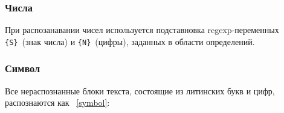 \subsubsection{Числа}\label{lexnumbers}


При распозанавании чисел используется подставновка regexp-переменных
\verb|{S}|\ (знак числа) и \verb|{N}|\ (цифры), заданных в области определений. 

\subsubsection{Символ}\label{lexsymbol}

Все нераспознанные блоки текста, состоящие из литинских букв и цифр,
распознаются как \ \ref{symbol}:

